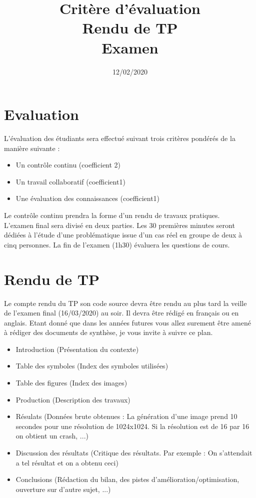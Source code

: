 \documentclass[french,12pt]{article}
\begin{document}
\title{Critère d'évaluation\\Rendu de TP\\Examen}
\date{12/02/2020}
\maketitle

\section{Evaluation}
L'évaluation des étudiants sera effectué suivant trois critères pondérés de la manière suivante :

\begin{itemize}
	\item Un contrôle continu (coefficient 2)
	\item Un travail collaboratif (coefficient1)
	\item Une évaluation des connaissances (coefficient1)
\end{itemize}

Le contrôle continu prendra la forme d'un rendu de travaux pratiques.\\
L'examen final sera divisé en deux parties. Les 30 premières minutes seront dédiées à l'étude d'une problématique issue d'un cas réel en groupe de deux à cinq personnes. La fin de l'examen (1h30) évaluera les questions de cours.

\section{Rendu de TP}
Le compte rendu du TP son code source devra être rendu au plus tard la veille de l'examen final (16/03/2020) au soir. Il devra être rédigé en français ou en anglais. Etant donné que dans les années futures vous allez surement être amené à rédiger des documents de synthèse, je vous invite à suivre ce plan.

\begin{itemize}
	\item Introduction (Présentation du contexte)
	\item Table des symboles (Index des symboles utilisées)
	\item Table des figures (Index des images)
	\item Production (Description des travaux)
	\item Résulats (Données brute obtenues : La génération d'une image prend 10 secondes pour une résolution de 1024x1024. Si la résolution est de 16 par 16 on obtient un crash, ...)
	\item Discussion des résultats (Critique des résultats. Par exemple : On s'attendait a tel résultat et on a obtenu ceci)
	\item Conclusions (Rédaction du bilan, des pistes d'amélioration/optimisation, ouverture sur d'autre sujet, ...)
\end{itemize}
\end{document}
